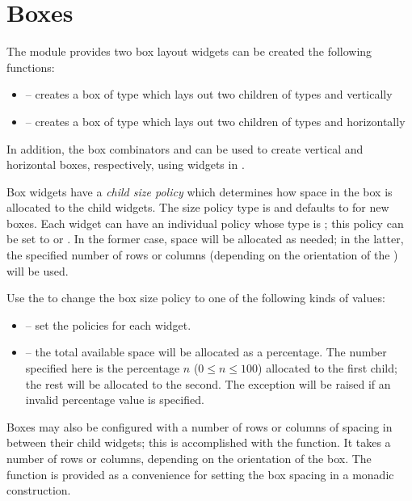 \section{Boxes}

The  module provides two box layout widgets can be created the
following functions:

\begin{itemize}
\item {} -- creates a box of type  which
  lays out two children of types  and 
  vertically
\item {} -- creates a box of type  which
  lays out two children of types  and 
  horizontally
\end{itemize}

In addition, the box combinators \fw{<-->} and \fw{<++>} can be used
to create vertical and horizontal boxes, respectively, using widgets
in .

Box widgets have a \textit{child size policy} which determines how
space in the box is allocated to the child widgets.  The size policy
type is  and defaults to  for new boxes.  Each widget can have an individual policy
whose type is ; this policy can be set to
 or .  In the former case, space will be
allocated as needed; in the latter, the specified number of rows or
columns (depending on the orientation of the ) will be used.

Use the  to change the box size policy to
one of the following kinds of values:

\begin{itemize}
\item {} -- set the
  policies for each widget.
\item {} -- the total available space will be
  allocated as a percentage.  The number specified here is the
  percentage $n$ ($0 \le n \le 100$) allocated to the first child; the
  rest will be allocated to the second.  The  exception
  will be raised if an invalid percentage value is specified.
\end{itemize}

Boxes may also be configured with a number of rows or columns of
spacing in between their child widgets; this is accomplished with the
 function.  It takes a number of rows or columns,
depending on the orientation of the box.  The function
 is provided as a convenience for setting the box
spacing in a monadic construction.

